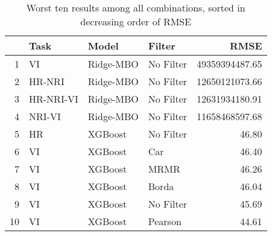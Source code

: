\begin{table}[ht!]
\centering
\caption{Worst ten results among all combinations, sorted in decreasing order of RMSE} 
\label{tab:perf-worst-10}
\begin{tabular}{rlllr}
  \hline
 & Task & Model & Filter & RMSE \\ 
  \hline
1 & VI & Ridge-MBO & No Filter & 49359394487.65 \\ 
  2 & HR-NRI & Ridge-MBO & No Filter & 12650121073.66 \\ 
  3 & HR-NRI-VI & Ridge-MBO & No Filter & 12631934180.91 \\ 
  4 & NRI-VI & Ridge-MBO & No Filter & 11658468597.68 \\ 
  5 & HR & XGBoost & No Filter & 46.80 \\ 
  6 & VI & XGBoost & Car & 46.40 \\ 
  7 & VI & XGBoost & MRMR & 46.26 \\ 
  8 & VI & XGBoost & Borda & 46.04 \\ 
  9 & VI & XGBoost & No Filter & 45.69 \\ 
  10 & VI & XGBoost & Pearson & 44.61 \\ 
   \hline
\end{tabular}
\end{table}
